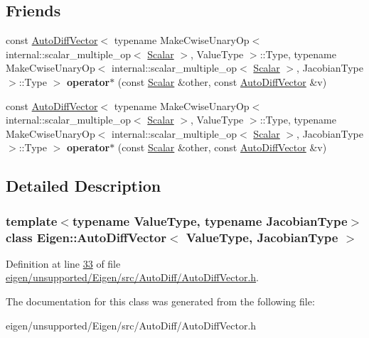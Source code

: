 \subsection*{Friends}
\begin{DoxyCompactItemize}
\item 
\mbox{\label{class_eigen_1_1_auto_diff_vector_ac1d70b32db3d79409163e82de81d9e6a}} 
const \hyperlink{class_eigen_1_1_auto_diff_vector}{Auto\+Diff\+Vector}$<$ typename Make\+Cwise\+Unary\+Op$<$ internal\+::scalar\+\_\+multiple\+\_\+op$<$ \hyperlink{class_eigen_1_1_auto_diff_scalar}{Scalar} $>$, Value\+Type $>$\+::Type, typename Make\+Cwise\+Unary\+Op$<$ internal\+::scalar\+\_\+multiple\+\_\+op$<$ \hyperlink{class_eigen_1_1_auto_diff_scalar}{Scalar} $>$, Jacobian\+Type $>$\+::Type $>$ {\bfseries operator$\ast$} (const \hyperlink{class_eigen_1_1_auto_diff_scalar}{Scalar} \&other, const \hyperlink{class_eigen_1_1_auto_diff_vector}{Auto\+Diff\+Vector} \&v)
\item 
\mbox{\label{class_eigen_1_1_auto_diff_vector_ac1d70b32db3d79409163e82de81d9e6a}} 
const \hyperlink{class_eigen_1_1_auto_diff_vector}{Auto\+Diff\+Vector}$<$ typename Make\+Cwise\+Unary\+Op$<$ internal\+::scalar\+\_\+multiple\+\_\+op$<$ \hyperlink{class_eigen_1_1_auto_diff_scalar}{Scalar} $>$, Value\+Type $>$\+::Type, typename Make\+Cwise\+Unary\+Op$<$ internal\+::scalar\+\_\+multiple\+\_\+op$<$ \hyperlink{class_eigen_1_1_auto_diff_scalar}{Scalar} $>$, Jacobian\+Type $>$\+::Type $>$ {\bfseries operator$\ast$} (const \hyperlink{class_eigen_1_1_auto_diff_scalar}{Scalar} \&other, const \hyperlink{class_eigen_1_1_auto_diff_vector}{Auto\+Diff\+Vector} \&v)
\end{DoxyCompactItemize}


\subsection{Detailed Description}
\subsubsection*{template$<$typename Value\+Type, typename Jacobian\+Type$>$\newline
class Eigen\+::\+Auto\+Diff\+Vector$<$ Value\+Type, Jacobian\+Type $>$}



Definition at line \hyperlink{eigen_2unsupported_2_eigen_2src_2_auto_diff_2_auto_diff_vector_8h_source_l00033}{33} of file \hyperlink{eigen_2unsupported_2_eigen_2src_2_auto_diff_2_auto_diff_vector_8h_source}{eigen/unsupported/\+Eigen/src/\+Auto\+Diff/\+Auto\+Diff\+Vector.\+h}.



The documentation for this class was generated from the following file\+:\begin{DoxyCompactItemize}
\item 
eigen/unsupported/\+Eigen/src/\+Auto\+Diff/\+Auto\+Diff\+Vector.\+h\end{DoxyCompactItemize}
